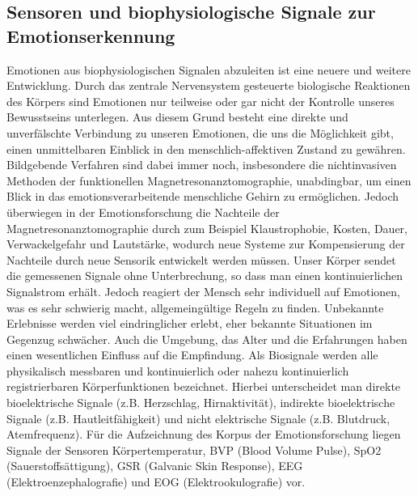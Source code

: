 \subsection{Sensoren und biophysiologische Signale zur Emotionserkennung} \label{grund-sensoren}


Emotionen aus biophysiologischen Signalen abzuleiten ist eine neuere und weitere Entwicklung.
Durch das zentrale Nervensystem gesteuerte biologische Reaktionen des Körpers sind Emotionen nur teilweise oder gar nicht der Kontrolle unseres Bewusstseins unterlegen.  Aus diesem Grund besteht eine direkte und unverfälschte Verbindung zu unseren Emotionen, die uns die Möglichkeit gibt, einen unmittelbaren Einblick in den menschlich-affektiven Zustand zu gewähren. Bildgebende Verfahren sind dabei immer noch, insbesondere die nichtinvasiven Methoden der funktionellen Magnetresonanztomographie, unabdingbar, um einen Blick in das emotionsverarbeitende menschliche Gehirn zu ermöglichen.  Jedoch überwiegen in der Emotionsforschung die Nachteile der Magnetresonanztomographie durch zum Beispiel Klaustrophobie, Kosten, Dauer, Verwackelgefahr und Lautstärke, wodurch neue Systeme zur Kompensierung der Nachteile durch neue Sensorik entwickelt werden müssen. Unser Körper sendet die gemessenen Signale ohne Unterbrechung, so dass man einen kontinuierlichen Signalstrom erhält. Jedoch reagiert der Mensch sehr individuell auf Emotionen, was es sehr schwierig macht, allgemeingültige Regeln zu finden. Unbekannte Erlebnisse werden viel eindringlicher erlebt, eher bekannte Situationen im Gegenzug schwächer. Auch die Umgebung, das Alter und die Erfahrungen haben einen wesentlichen Einfluss auf die Empfindung. Als Biosignale werden alle physikalisch messbaren und kontinuierlich oder nahezu kontinuierlich registrierbaren Körperfunktionen bezeichnet. Hierbei unterscheidet man direkte bioelektrische Signale (z.B. Herzschlag, Hirnaktivität), indirekte bioelektrische Signale (z.B. Hautleitfähigkeit) und nicht elektrische Signale (z.B. Blutdruck, Atemfrequenz). Für die Aufzeichnung des Korpus der Emotionsforschung liegen Signale der Sensoren Körpertemperatur, BVP (Blood Volume Pulse), SpO2 (Sauerstoffsättigung), GSR (Galvanic Skin Response), EEG (Elektroenzephalografie) und EOG (Elektrookulografie) vor.














